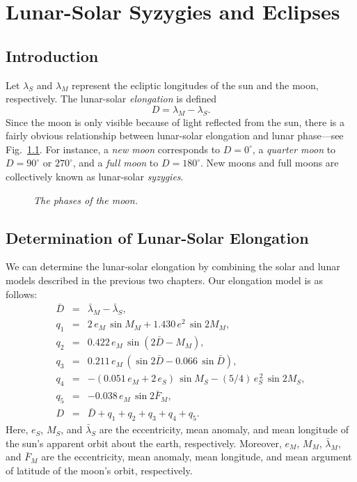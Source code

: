 \chapter{Lunar-Solar Syzygies and Eclipses}
\section{Introduction}
Let $\lambda_S$ and $\lambda_M$ represent the ecliptic longitudes
of the sun and the moon, respectively. The lunar-solar {\em elongation}\/  is defined
\begin{equation}
D = \lambda_M - \lambda_S.
\end{equation}
Since the  moon is only visible because of light reflected from the sun, there is a fairly obvious relationship between lunar-solar elongation and lunar
phase---see Fig.~\ref{fphase}. For instance, a {\em new moon}\/ corresponds to 
$D = 0^\circ$, a {\em quarter moon}\/ to $D = 90^\circ$ or $270^\circ$, and a {\em full moon}\/ to $D = 180^\circ$. New moons and full moons are collectively known as lunar-solar {\em syzygies}. 

\begin{figure}[h]
\epsfysize=3in
\centerline{}
\caption{\em The phases of the moon.}\label{fphase}
\end{figure}

\section{Determination of Lunar-Solar Elongation}
We can determine the  lunar-solar elongation  by combining the solar and
lunar models described in the previous two chapters. Our elongation model is as
follows:
\begin{eqnarray}
\bar{D} &=& \bar{\lambda}_M - \bar{\lambda}_S,\\[0.5ex]
q_1 &=& 2\,e_M\,\sin M_M + 1.430\,e^2\,\sin 2M_M,\\[0.5ex]
q_2 &=& 0.422\,e_M\,\sin (2\bar{D} - M_M),\\[0.5ex]
q_3 &=& 0.211\,e_M\,(\sin 2\bar{D} - 0.066\,\sin \bar{D}),\\[0.5ex]
q_4 &=& -(0.051\,e_M+2\,e_S)\,\sin M_S - (5/4)\,e_S^{\,2}\,\sin 2 M_S,\\[0.5ex]
q_5&=& -0.038\,e_M\,\sin 2 \bar{F}_M,\\[0.5ex]
D &=& \bar{D} + q_1+q_2+q_3+q_4+q_5.
\end{eqnarray}
Here, $e_S$, $M_S$,  and $\bar{\lambda}_S$  are the eccentricity, mean anomaly,  and mean longitude  of the sun's apparent orbit about the earth, respectively. Moreover, $e_M$,
$M_M$, $\bar{\lambda}_M$, and $\bar{F}_M$ are the eccentricity, 
mean anomaly, mean longitude, and mean argument of latitude of
the moon's orbit, respectively.

